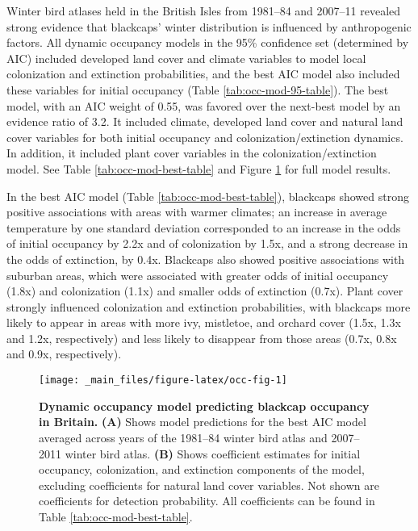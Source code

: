 \documentclass[a4paper, nobind]{templates/ociamthesis}
\begin{document}
Winter bird atlases held in the British Isles from 1981--84 and 2007--11 revealed strong evidence that blackcaps' winter distribution is influenced by anthropogenic factors. All dynamic occupancy models in the 95\% confidence set (determined by AIC) included developed land cover and climate variables to model local colonization and extinction probabilities, and the best AIC model also included these variables for initial occupancy (Table \ref{tab:occ-mod-95-table}). The best model, with an AIC weight of 0.55, was favored over the next-best model by an evidence ratio of 3.2. It included climate, developed land cover and natural land cover variables for both initial occupancy and colonization/extinction dynamics. In addition, it included plant cover variables in the colonization/extinction model. See Table \ref{tab:occ-mod-best-table} and Figure \ref{fig:occ-fig} for full model results.

In the best AIC model (Table \ref{tab:occ-mod-best-table}), blackcaps showed strong positive associations with areas with warmer climates; an increase in average temperature by one standard deviation corresponded to an increase in the odds of initial occupancy by 2.2x and of colonization by 1.5x, and a strong decrease in the odds of extinction, by 0.4x. Blackcaps also showed positive associations with suburban areas, which were associated with greater odds of initial occupancy (1.8x) and colonization (1.1x) and smaller odds of extinction (0.7x). Plant cover strongly influenced colonization and extinction probabilities, with blackcaps more likely to appear in areas with more ivy, mistletoe, and orchard cover (1.5x, 1.3x and 1.2x, respectively) and less likely to disappear from those areas (0.7x, 0.8x and 0.9x, respectively).



\begin{figure}
\texttt{[image: \_main\_files/figure-latex/occ-fig-1]} \caption{\textbf{Dynamic occupancy model predicting blackcap occupancy in Britain.} \textbf{(A)} Shows model predictions for the best AIC model averaged across years of the 1981--84 winter bird atlas and 2007--2011 winter bird atlas. \textbf{(B)} Shows coefficient estimates for initial occupancy, colonization, and extinction components of the model, excluding coefficients for natural land cover variables. Not shown are coefficients for detection probability. All coefficients can be found in Table \ref{tab:occ-mod-best-table}.}\label{fig:occ-fig}
\end{figure}
\end{document}
